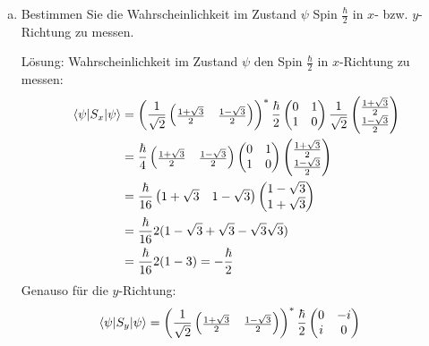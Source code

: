 \documentclass{scrartcl}
\begin{document}
\begin{enumerate}[a)]
\item Bestimmen Sie die Wahrscheinlichkeit im Zustand $\psi$ Spin $\frac{\hbar}{2}$ in $x$- bzw. $y$-Richtung zu messen.
\item[Lösung:]
Wahrscheinlichkeit im Zustand $\psi$ den Spin $\frac\hbar 2$ in $x$-Richtung zu messen:
\begin{align*}
\braket{\psi|S_x|\psi}	
	&= 
	\left(\frac 1{\sqrt 2} \begin{pmatrix}\frac{1+\sqrt 3}{2} & \frac{1-\sqrt 3}{2}\end{pmatrix}\right)^\ast
	\frac \hbar 2 \begin{pmatrix} 0&1\\1&0 \end{pmatrix}
	\frac 1{\sqrt 2}\begin{pmatrix}\frac{1+\sqrt 3}{2}\\\frac{1-\sqrt 3}{2}\end{pmatrix}\\
	&= 	
	\frac \hbar 4 \begin{pmatrix}\frac{1+\sqrt 3}{2} & \frac{1-\sqrt 3}{2}\end{pmatrix}
	\begin{pmatrix} 0&1\\1&0 \end{pmatrix}
	\begin{pmatrix}\frac{1+\sqrt 3}{2}\\\frac{1-\sqrt 3}{2}\end{pmatrix}\\
	&=
	\frac \hbar {16} \begin{pmatrix}1+\sqrt 3 & 1-\sqrt 3\end{pmatrix}
	\begin{pmatrix}1-\sqrt 3\\1+\sqrt 3\end{pmatrix}\\
	&=
	\frac \hbar {16} 2 (1 -\sqrt 3 +\sqrt 3 -\sqrt 3 \sqrt 3)\\ 
	&=
	\frac \hbar {16} 2 (1 - 3) = -\frac \hbar 2
\end{align*}
Genauso für die $y$-Richtung:
\begin{align*}
\braket{\psi|S_y|\psi}	
	&= 
	\left(\frac 1{\sqrt 2} \begin{pmatrix}\frac{1+\sqrt 3}{2} & \frac{1-\sqrt 3}{2}\end{pmatrix}\right)^\ast
	\frac \hbar 2 \begin{pmatrix} 0&-i\\i&0 \end{pmatrix}

\end{align*}
\end{enumerate}
\end{document}
